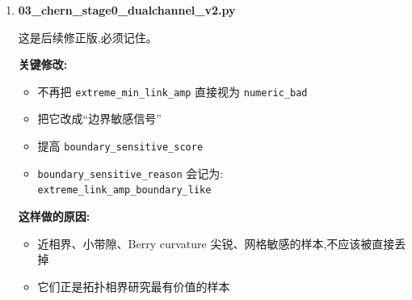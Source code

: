 \documentclass[lang=cn,scheme=chinese,color=blue,device=normal,toc=onecol,math=cm]{elegantbook}
\begin{document}
\begin{enumerate}
最初版本建立了三通道思想:\par
 
\begin{itemize}
\item \texttt{chern\_\allowbreak{}reliable\_\allowbreak{}strict}
\item \texttt{boundary\_\allowbreak{}sensitive\_\allowbreak{}flag /\allowbreak{} score}
\item \texttt{numeric\_\allowbreak{}bad\_\allowbreak{}flag}
\end{itemize}
 
但最初 \texttt{numeric\_\allowbreak{}bad} 过强:\par
 
\begin{itemize}
\item \texttt{extreme\_\allowbreak{}min\_\allowbreak{}link\_\allowbreak{}amp} 被当作硬坏点
\item 导致 \texttt{boundary\_\allowbreak{}flag} 过少,\texttt{numeric\_\allowbreak{}bad} 过多
\end{itemize}
\item \textbf{03\_\allowbreak{}chern\_\allowbreak{}stage0\_\allowbreak{}dualchannel\_\allowbreak{}v2.py}\par
 
这是后续修正版,必须记住。\par
 
\textbf{关键修改:}\par
 
\begin{itemize}
\item 不再把 \texttt{extreme\_\allowbreak{}min\_\allowbreak{}link\_\allowbreak{}amp} 直接视为 \texttt{numeric\_\allowbreak{}bad}
\item 把它改成“边界敏感信号”
\item 提高 \texttt{boundary\_\allowbreak{}sensitive\_\allowbreak{}score}
\item \texttt{boundary\_\allowbreak{}sensitive\_\allowbreak{}reason} 会记为:\\ \texttt{extreme\_\allowbreak{}link\_\allowbreak{}amp\_\allowbreak{}boundary\_\allowbreak{}like}
\end{itemize}
 
\textbf{这样做的原因:}\par
 
\begin{itemize}
\item 近相界、小带隙、Berry curvature 尖锐、网格敏感的样本,不应该被直接丢掉
\item 它们正是拓扑相界研究最有价值的样本
\end{itemize}
 

\end{enumerate}
\end{document}
